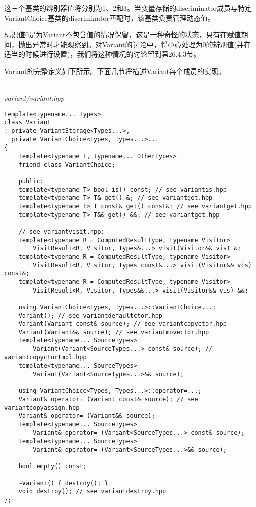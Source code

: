 这三个基类的辨别器值将分别为1、2和3。当变量存储的discriminator成员与特定VariantChoice基类的discriminator匹配时，该基类负责管理动态值。

标识值0是为Variant不包含值的情况保留，这是一种奇怪的状态，只有在赋值期间，抛出异常时才能观察到。对Variant的讨论中，将小心处理为0的辨别值(并在适当的时候进行设置)，我们将这种情况的讨论留到第26.4.3节。

Variant的完整定义如下所示。下面几节将描述Variant每个成员的实现。

\hspace*{\fill} \\ %
\noindent
\textit{variant/variant.hpp}
\begin{lstlisting}[style=styleCXX]
template<typename... Types>
class Variant
: private VariantStorage<Types...>,
  private VariantChoice<Types, Types...>...
{
	template<typename T, typename... OtherTypes>
	friend class VariantChoice;
	
	public:
	template<typename T> bool is() const; // see variantis.hpp
	template<typename T> T& get() &; // see variantget.hpp
	template<typename T> T const& get() const&; // see variantget.hpp
	template<typename T> T&& get() &&; // see variantget.hpp
	
	// see variantvisit.hpp:
	template<typename R = ComputedResultType, typename Visitor>
		VisitResult<R, Visitor, Types&...> visit(Visitor&& vis) &;
	template<typename R = ComputedResultType, typename Visitor>
		VisitResult<R, Visitor, Types const&...> visit(Visitor&& vis) const&;
	template<typename R = ComputedResultType, typename Visitor>
		VisitResult<R, Visitor, Types&&...> visit(Visitor&& vis) &&;
	
	using VariantChoice<Types, Types...>::VariantChoice...;
	Variant(); // see variantdefaultctor.hpp
	Variant(Variant const& source); // see variantcopyctor.hpp
	Variant(Variant&& source); // see variantmovector.hpp
	template<typename... SourceTypes>
		Variant(Variant<SourceTypes...> const& source); // variantcopyctortmpl.hpp
	template<typename... SourceTypes>
		Variant(Variant<SourceTypes...>&& source);
	
	using VariantChoice<Types, Types...>::operator=...;
	Variant& operator= (Variant const& source); // see variantcopyassign.hpp
	Variant& operator= (Variant&& source);
	template<typename... SourceTypes>
		Variant& operator= (Variant<SourceTypes...> const& source);
	template<typename... SourceTypes>
		Variant& operator= (Variant<SourceTypes...>&& source);
	
	bool empty() const;
	
	~Variant() { destroy(); }
	void destroy(); // see variantdestroy.hpp
};
\end{lstlisting}








